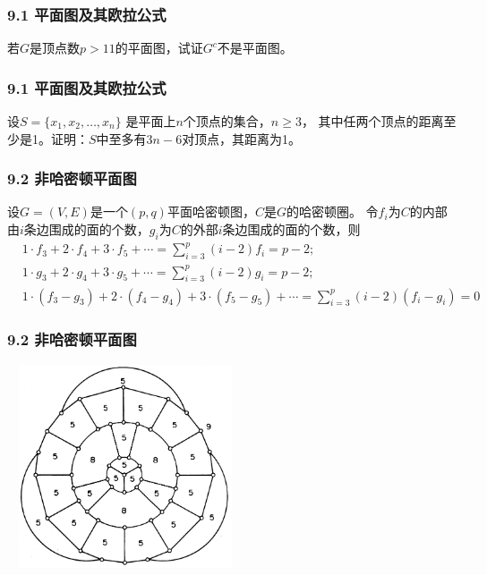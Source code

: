 \documentclass{beamer}
\begin{document}
\begin{CJK}{UTF8}{gbsn}
\begin{frame}
  \frametitle{9.1 平面图及其欧拉公式}
  \begin{exercise3}
    若$G$是顶点数$p > 11$的平面图，试证$G^c$不是平面图。
  \end{exercise3}
\end{frame}
\begin{frame}
  \frametitle{9.1 平面图及其欧拉公式}
  \begin{exercise4}
    设$S = \{x_1, x_2, \ldots, x_n\}$ 是平面上$n$个顶点的集合，$n \geq 3$， 其中任两个顶点的距离至少是1。证明：$S$中至多有$3n-6$对顶点，其距离为1。
  \end{exercise4}
\end{frame}

\begin{frame}
  \frametitle{9.2 非哈密顿平面图}
  \begin{theorem9.2.1}
    设$G=(V,E)$是一个$(p,q)$平面哈密顿图，$C$是$G$的哈密顿圈。
    令$f_i$为$C$的内部由$i$条边围成的面的个数，$g_i$为$C$的外部$i$条边围成的面的个数，则
    \begin{align}
      &1 \cdot f_3 + 2 \cdot f_4 + 3 \cdot f_5 + \cdots = \sum_{i=3}^p(i-2)f_i = p - 2;\\
      &1 \cdot g_3 + 2 \cdot g_4 + 3 \cdot g_5 + \cdots = \sum_{i=3}^p(i-2)g_i = p - 2;\\
      &1 \cdot (f_3 - g_3) + 2 \cdot (f_4 - g_4) + 3 \cdot (f_5 - g_5) + \cdots = \sum_{i=3}^p(i-2)(f_i - g_i) = 0
    \end{align}
  \end{theorem9.2.1}
\end{frame}

\begin{frame}
  \frametitle{9.2 非哈密顿平面图}
  \centering
  \includegraphics[width=7cm, height=6cm]{grinberg}
\end{frame}


\end{CJK}
\end{document}
